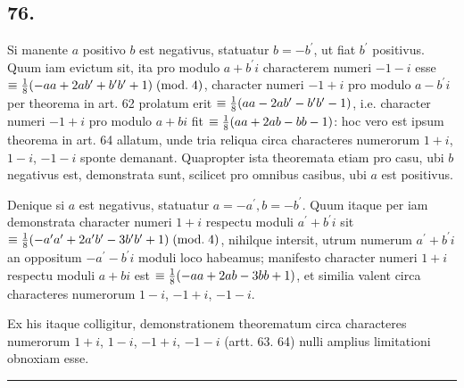 \documentclass[twoside,12pt, showframe]{memoir}
\renewcommand{\pmod}[1]{\;(\textrm{mod.}\;#1)}
\let\oldfrac\frac
\def\frac#1#2{\mathchoice{\tfrac{#1}{#2}}{\oldfrac{#1}{#2}}{\genfrac{}{}{}{2}{#1}{#2\mathstrut}}{\genfrac{}{}{}{3}{#1}{#2\mathstrut}}}
\begin{document}
\subsection*{76.}
 
Si manente \(a\) positivo \(b\) est negativus, statuatur \(b=-b^{\prime}\), ut fiat \(b^{\prime}\) positivus. Quum iam evictum sit, ita pro modulo \(a+b^{\prime} i\) characterem numeri \(-1-i\) esse \(\equiv \frac{1}{8}(-a a+2 a b^{\prime}+b^{\prime} b^{\prime}+1)\pmod{4}\), character numeri \(-1+i\) pro modulo \(a-b^{\prime} i\) per theorema in art. 62 prolatum erit \(\equiv \frac{1}{8}(a a-2 a b^{\prime}-b^{\prime} b^{\prime}-1)\), i.e. character numeri \(-1+i\) pro modulo \(a+b i\) fit \(\equiv \frac{1}{8}(a a+2 a b-b b-1)\): hoc vero est ipsum theorema in art. 64 allatum, unde tria reliqua circa characteres numerorum \(1+i\), \(1-i\), \(-1-i\) sponte demanant. Quapropter ista theoremata etiam pro casu, ubi \(b\) negativus est, demonstrata sunt, scilicet pro omnibus casibus, ubi \(a\) est positivus.
 
Denique si \(a\) est negativus, statuatur \(a=-a^{\prime}, b=-b^{\prime}\). Quum itaque per iam demonstrata character numeri \(1+i\) respectu moduli \(a^{\prime}+b^{\prime} i\) sit \(\equiv \frac{1}{8}(-a^{\prime} a^{\prime}+2 a^{\prime} b^{\prime}-3 b^{\prime} b^{\prime}+1)\pmod{4}\), nihilque intersit, utrum numerum \(a^{\prime}+b^{\prime} i\) an oppositum \(-a^{\prime}-b^{\prime} i\) moduli loco habeamus; manifesto character numeri \(1+i\) respectu moduli \(a+b i\) est \(\equiv \frac{1}{8}(-a a+2 a b-3 b b+1)\), et similia valent circa characteres numerorum \(1-i\), \(-1+i\), \(-1-i\).
 
Ex his itaque colligitur, demonstrationem theorematum circa characteres numerorum \(1+i\), \(1-i\), \(-1+i\), \(-1-i\) (artt. 63. 64) nulli amplius limitationi obnoxiam esse.
\begin{center}\rule{1.5in}{0.5pt}\end{center}
\end{document}
